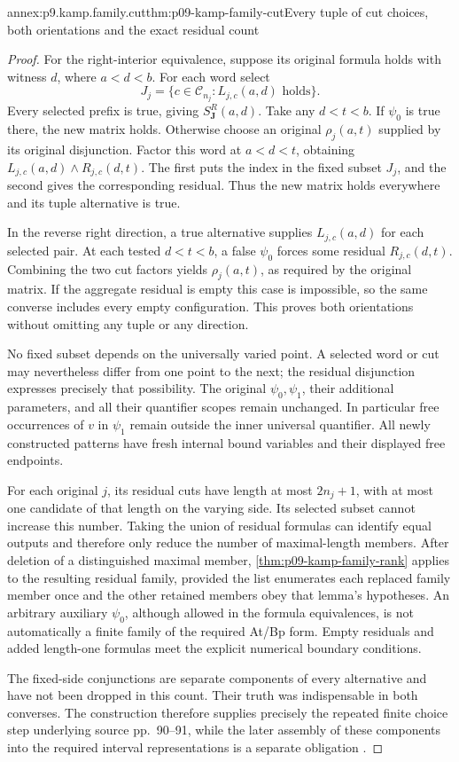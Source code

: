 \begin{annexitem}{annex:p9.kamp.family.cut}{thm:p09-kamp-family-cut}{Every tuple of cut choices, both orientations and the exact residual count}
\begin{proof}
For the right-interior equivalence, suppose its original formula
holds with witness \(d\), where \(a<d<b\). For each word
select
\[
             J_j=\{c\in\mathcal C_{n_j}:L_{j,c}(a,d)\text{ holds}\}.
\]
Every selected prefix is true, giving \(S_{\mathbf J}^R(a,d)\).
Take any \(d<t<b\). If \(\psi_0\) is true there, the
new matrix holds. Otherwise choose an original \(\rho_j(a,t)\)
supplied by its original disjunction. Factor this word at
\(a<d<t\), obtaining
\(L_{j,c}(a,d)\land R_{j,c}(d,t)\).
The first puts the index in the fixed subset \(J_j\), and
the second gives the corresponding residual. Thus the new matrix
holds everywhere and its tuple alternative is true.

In the reverse right direction, a true alternative supplies
\(L_{j,c}(a,d)\) for each selected pair. At each tested
\(d<t<b\), a false \(\psi_0\) forces some residual
\(R_{j,c}(d,t)\). Combining the two cut factors yields
\(\rho_j(a,t)\), as required by the original matrix.
If the aggregate residual is empty this case is impossible, so
the same converse includes every empty configuration. This proves
both orientations without omitting any tuple or any direction.

No fixed subset depends on the universally varied point. A selected
word or cut may nevertheless differ from one point to the next;
the residual disjunction expresses precisely that possibility.
The original \(\psi_0,\psi_1\), their additional parameters,
and all their quantifier scopes remain unchanged. In particular
free occurrences of \(v\) in \(\psi_1\) remain outside the
inner universal quantifier. All newly constructed patterns have
fresh internal bound variables and their displayed free endpoints.

For each original \(j\), its residual cuts have length at
most \(2n_j+1\), with at most one candidate of that length
on the varying side. Its selected subset cannot increase this
number. Taking the union of residual formulas can identify equal
outputs and therefore only reduce the number of maximal-length
members. After deletion of a distinguished maximal member,
\cref{thm:p09-kamp-family-rank} applies to the resulting
residual family, provided the list enumerates each replaced family
member once and the other retained members obey that lemma's
hypotheses. An arbitrary auxiliary \(\psi_0\), although allowed
in the formula equivalences, is not automatically a finite family
of the required At/Bp form. Empty residuals and added length-one
formulas meet the explicit numerical boundary conditions.

The fixed-side conjunctions are separate components of every
alternative and have not been dropped in this count. Their
truth was indispensable in both converses. The construction
therefore supplies precisely the repeated finite choice step
underlying source pp.~90--91, while the later assembly of these
components into the required interval representations is a
separate obligation \cite[ch.~III, pp.~80--83, 90--91]{Kamp1968}.
\end{proof}
\end{annexitem}

